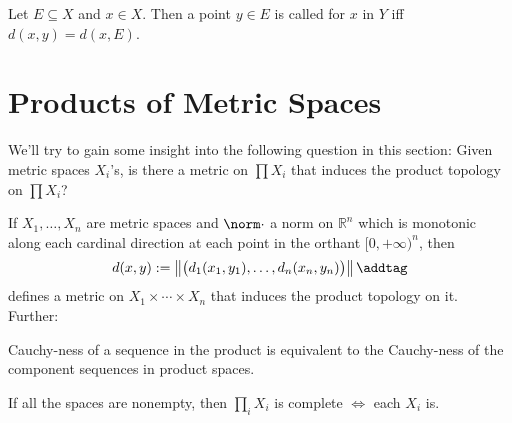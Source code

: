 	Let $E\subseteq X$ and $x\in X$. Then a point $y\in E$ is called  for $x$ in $Y$ iff $d(x, y) = d(x, E)$.
	
	
	
	
\section{Products of Metric Spaces}

	We'll try to gain some insight into the following question in this section: Given metric spaces $X_i$'s, is there a metric on $\prod X_i$ that induces the product topology on $\prod X_i$?
	
	\begin{prp}\label{PRP: finite prod of metr spaces is metrizable}
		If $X_1, \ldots, X_n$ are metric spaces and $\norm\cdot$ a norm on $\mathbb R^n$ which is monotonic along each cardinal direction at each point in the orthant $[0, +\infty)^n$, then
		\[
		d(x, y) := \left\Vert \bigl(d_1(x_1, y_1), \ldots, d_n(x_n, y_n)\bigr) \right\Vert\addtag\label{EQN: metric on finite product}
		\]
		defines a metric on $X_1\times\cdots\times X_n$ that induces the product topology on it. Further:
		\begin{mylist}
			\item\label{PRPi: finite prod of metr spaces is metrizable} Cauchy-ness of a sequence in the product is equivalent to the Cauchy-ness of the component sequences in product spaces.
			
			\item\label{PRPii: finite prod of metr spaces is metrizable} If all the spaces are nonempty, then $\prod_i X_i$ is complete $\iff$ each $X_i$ is.
		\end{mylist}
	\end{prp}
	
